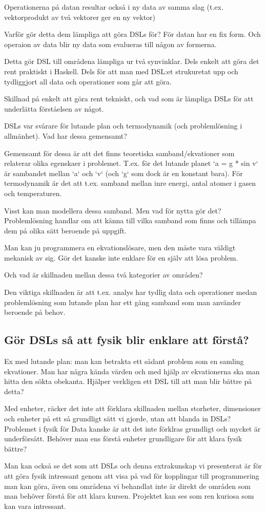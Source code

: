 \begin{binge}
Operationerna på datan resultar också i ny data av samma slag (t.ex.
vektorprodukt av två vektorer ger en ny vektor)

Varför gör detta dem lämpliga att göra DSLs för? För datan har en fix form. Och
operaion av data blir ny data som evalueras till någon av formerna.

Detta gör DSL till områdena lämpliga ur två synvinklar. Dels enkelt att göra
det rent praktiskt i Haskell. Dels för att man med DSL:et strukuretat upp och
tydliggjort all data och operationer som går att göra.

Skillnad på enkelt att göra rent tekniskt, och vad som är lämpliga DSLs för att
underlätta förståelsen av något.

\newpage

DSLs var svårare för lutande plan och termodynamik (och problemlösning i
allmänhet). Vad har dessa gemensamt?

Gemensamt för dessa är att det finns teoretiska samband/ekvationer som
relaterar olika egenskaer i problemet. T.ex. för det lutande planet `a = g *
sin v` är sambandet mellan `a` och `v` (och `g` som dock är en konstant bara).
För termodynamik är det att t.ex. samband mellan inre energi, antal atomer i
gasen och temperaturen.

Visst kan man modellera dessa samband. Men vad för nytta gör det?
Problemlösning handlar om att känna till vilka samband som finns och tillämpa
dem på olika sätt beroende på uppgift.

Man kan ju programmera en ekvationslösare, men den måste vara väldigt mekanisk
av sig. Gör det kanske inte enklare för en själv att lösa problem.

Och vad är skillnaden mellan dessa två kategorier av områden?

Den viktiga skillnaden är att t.ex. analys har tydlig data och operationer
medan problemlösning som lutande plan har ett gäng samband som man använder
beroende på behov.

\subsection{Gör DSLs så att fysik blir enklare att förstå?}

Ex med lutande plan: man kan betrakta ett sådant problem som en samling
ekvationer. Man har några kända värden och med hjälp av ekvationerna ska man
hitta den sökta obekanta. Hjälper verkligen ett DSL till att man blir bättre på
detta?

Med enheter, räcker det inte att förklara skillnaden mellan storheter,
dimensioner och enheter på ett så grundligt sätt vi gjorde, utan att blanda in
DSLs? Problemet i fysik för Data kanske är att det inte förklras grundligt och
mycket är underförsått. Behöver man ens förstå enheter grundligare för att
klara fysik bättre?

Man kan också se det som att DSLs och denna extrakunskap vi presenterat är för
att göra fysik intressant genom att visa på vad för kopplingar till
programmering man kan göra, även om områdena vi behandlat inte är direkt de
områden som man behöver förstå för att klara kursen. Projektet kan ses som ren
kuriosa som kan vara intressant.

\end{binge}
